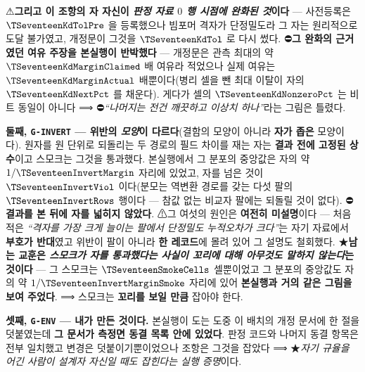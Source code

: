 \documentclass[11pt]{report}
\numberwithin{equation}{chapter}
\numberwithin{figure}{chapter}
\numberwithin{table}{chapter}
\begin{document}
⚠\textbf{그리고 이 조항의 자 자신이 \emph{판정 자료 $0$ 행 시점에 완화된 것}이다} ---
사전등록은 $\TSeventeenKdTolPre$ 을 등록했으나 빔포머 격자가 단정밀도라 그 자는 원리적으로
도달 불가였고, 개정문이 그것을 $\TSeventeenKdTol$ 로 다시 썼다. ⛔\textbf{그 완화의
근거였던 여유 주장을 본실행이 반박했다} --- 개정문은 관측 최대의 약
$\TSeventeenKdMarginClaimed$ 배 여유라 적었으나 실제 여유는 $\TSeventeenKdMarginActual$
배뿐이다(병리 셀을 뺀 최대 이탈이 자의 $\TSeventeenKdNextPct$ 를 채운다). 게다가 셀의
$\TSeventeenKdNonzeroPct$ 는 비트 동일이 아니다 ⟹ ⛔\emph{``나머지는 전건 깨끗하고 이상치
하나''}라는 그림은 틀렸다.

\textbf{둘째, \texttt{G-INVERT} --- 위반의 \emph{모양}이 다르다}(결함의 모양이 아니라
\textbf{자가 좁은} 모양이다). 원자를 원 단위로 되돌리는 두 경로의 필드 차이를 재는 자는
\textbf{결과 전에 고정된 상수}이고 스모크는 그것을 통과했다. 본실행에서 그 분포의 중앙값은
자의 약 $1/\TSeventeenInvertMargin$ 자리에 있었고, 자를 넘은 것이
$\TSeventeenInvertViol$ 이다(분모는 역변환 경로를 갖는 다섯 팔의 $\TSeventeenInvertRows$
행이다 --- 참값 없는 비교자 팔에는 되돌릴 것이 없다). ⛔\textbf{결과를 본 뒤에 자를 넓히지
않았다}. ⚠그 여섯의 원인은 \textbf{여전히 미설명}이다 --- 처음 적은 \emph{``격자를 가장
크게 늘이는 팔에서 단정밀도 누적오차가 크다''}는 자기 자료에서 \textbf{부호가 반대}였고
위반이 팔이 아니라 \textbf{한 레코드}에 몰려 있어 그 설명도 철회했다.
★\textbf{남는 교훈은 \emph{스모크가 자를 통과했다는 사실이 꼬리에 대해 아무것도 말하지
않는다}는 것이다} --- 그 스모크는 $\TSeventeenSmokeCells$ 셀뿐이었고 그 분포의 중앙값도
자의 약 $1/\TSeventeenInvertMarginSmoke$ 자리에 있어 \textbf{본실행과 거의 같은 그림을
보여 주었다}. ⟹ 스모크는 \textbf{꼬리를 보일 만큼} 잡아야 한다.

\textbf{셋째, \texttt{G-ENV} --- 내가 만든 것이다.} 본실행이 도는 도중 이 배치의 개정
문서에 한 절을 덧붙였는데 \textbf{그 문서가 측정면 동결 목록 안에 있었다}. 판정 코드와
나머지 동결 항목은 전부 일치했고 변경은 덧붙이기뿐이었으나 조항은 그것을 잡았다 ⟹
★\emph{자기 규율을 어긴 사람이 설계자 자신일 때도 잡힌다는 실행 증명}이다.
\end{document}
